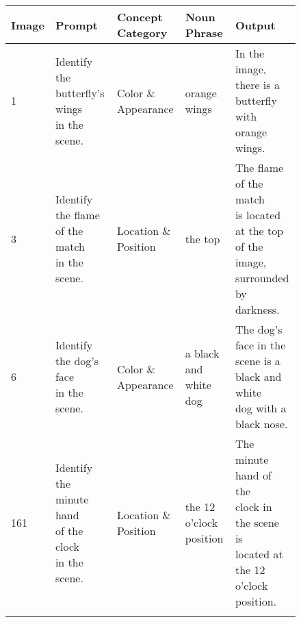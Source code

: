 \begin{figure*}[t]
\begin{minipage}{\textwidth}
\centering
\begin{tabular}{l|llll}
\hline
\textbf{Image} & \textbf{Prompt} & \textbf{Concept Category} & \textbf{Noun Phrase} & \textbf{Output} \\ \hline
1 & \makecell[l]{Identify the butterfly's wings \\in the scene.} & Color \& Appearance & orange wings & \makecell[l]{In the image, there is a\\ butterfly with\\ orange wings.}\\
3 & \makecell[l]{Identify the flame of the match\\ in the scene.} & Location \& Position & the top & \makecell[l]{The flame of the match\\ is located at the top\\ of the image, surrounded\\ by darkness.}\\
6 & \makecell[l]{Identify the dog's face\\ in the scene.} & Color \& Appearance & a black and white dog & \makecell[l]{The dog's face in the\\ scene is a black and white\\ dog with a black nose.} \\
161 & \makecell[l]{Identify the minute hand\\ of the clock\\ in the scene.} & Location \& Position & the 12 o'clock position & \makecell[l]{The minute hand of the\\ clock in the scene is\\ located at the 12 o'clock\\ position.} \\ 
\\ \hline
\end{tabular}
\end{minipage}


\end{figure*}
